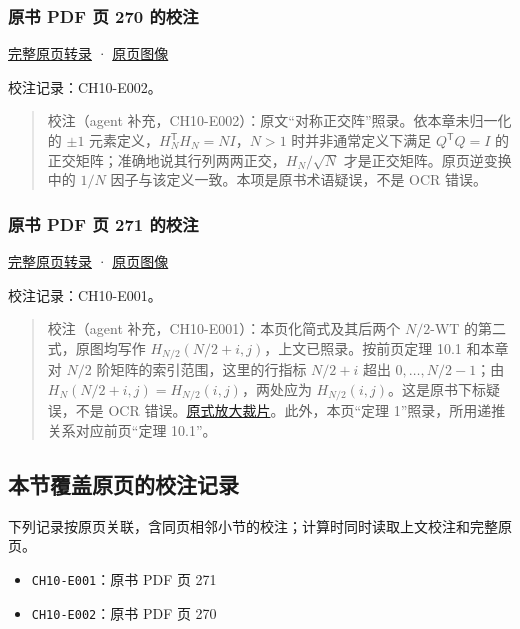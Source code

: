 \documentclass[
  10pt,
  fontset=fandol]{ctexart}
\providecommand{\tightlist}{%
  \setlength{\itemsep}{0pt}\setlength{\parskip}{0pt}}
\begin{document}
\subsubsection{原书 PDF 页 270 的校注}\label{ux539fux4e66-pdf-ux9875-270-ux7684ux6821ux6ce8}

\href{../pages/pdf-270.md}{完整原页转录} · \href{../../source-images/pdf-270.jpeg}{原页图像}

校注记录：CH10-E002。

\begin{quote}
校注（agent 补充，CH10-E002）：原文``对称正交阵''照录。依本章未归一化的 \(\pm1\) 元素定义，\(H_N^\mathsf{T}H_N=NI\)，\(N>1\) 时并非通常定义下满足 \(Q^\mathsf{T}Q=I\) 的正交矩阵；准确地说其行列两两正交，\(H_N/\sqrt N\) 才是正交矩阵。原页逆变换中的 \(1/N\) 因子与该定义一致。本项是原书术语疑误，不是 OCR 错误。
\end{quote}

\subsubsection{原书 PDF 页 271 的校注}\label{ux539fux4e66-pdf-ux9875-271-ux7684ux6821ux6ce8}

\href{../pages/pdf-271.md}{完整原页转录} · \href{../../source-images/pdf-271.jpeg}{原页图像}

校注记录：CH10-E001。

\begin{quote}
校注（agent 补充，CH10-E001）：本页化简式及其后两个 \(N/2\)-WT 的第二式，原图均写作 \(H_{N/2}(N/2+i,j)\)，上文已照录。按前页定理 10.1 和本章对 \(N/2\) 阶矩阵的索引范围，这里的行指标 \(N/2+i\) 超出 \(0,\ldots,N/2-1\)；由 \(H_N(N/2+i,j)=H_{N/2}(i,j)\)，两处应为 \(H_{N/2}(i,j)\)。这是原书下标疑误，不是 OCR 错误。\href{../assets/ch10/erratum-p271-indices.png}{原式放大裁片}。此外，本页``定理 1''照录，所用递推关系对应前页``定理 10.1''。
\end{quote}

\subsection{本节覆盖原页的校注记录}\label{ux672cux8282ux8986ux76d6ux539fux9875ux7684ux6821ux6ce8ux8bb0ux5f55}

下列记录按原页关联，含同页相邻小节的校注；计算时同时读取上文校注和完整原页。

\begin{itemize}
\tightlist
\item
  \texttt{CH10-E001}：原书 PDF 页 271
\item
  \texttt{CH10-E002}：原书 PDF 页 270
\end{itemize}
\end{document}
